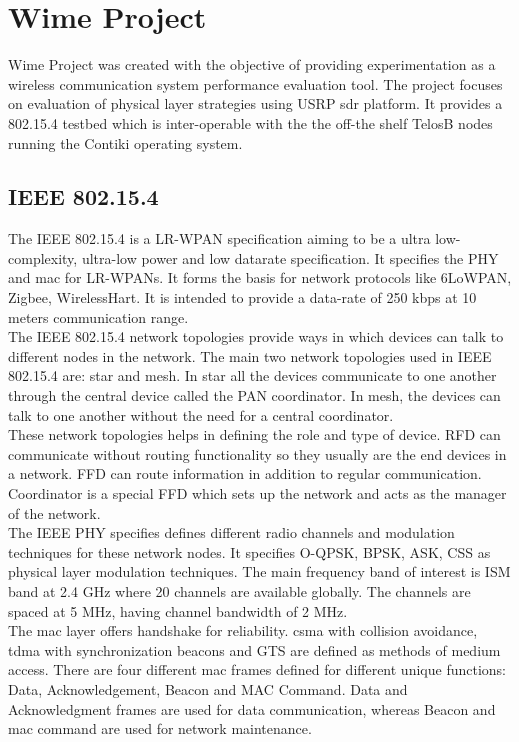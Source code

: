 \section{Wime Project}
Wime Project was created with the objective of providing experimentation as a wireless communication system performance evaluation tool.
The project focuses on evaluation of physical layer strategies using USRP \ac{sdr} platform.
It provides a 802.15.4 testbed which is inter-operable with the the off-the shelf TelosB nodes running the Contiki operating system.

\subsection{IEEE 802.15.4}
The IEEE 802.15.4 is a \ac{LR-WPAN} specification aiming to be a ultra low-complexity, ultra-low power and low datarate specification.
It specifies the \ac{PHY} and \ac{mac} for \ac{LR-WPAN}s.
It forms the basis for network protocols like \ac{6LoWPAN}, Zigbee, WirelessHart.
It is intended to provide a data-rate of 250 kbps at 10 meters communication range.\\

The IEEE 802.15.4 network topologies provide ways in which devices can talk to different nodes in the network.
The main two network topologies used in IEEE 802.15.4 are: star and mesh.
In star all the devices communicate to one another through the central device called the \ac{PAN} coordinator.
In mesh, the devices can talk to one another without the need for a central coordinator.\\

These network topologies helps in defining the role and type of device.
\ac{RFD} can communicate without routing functionality so they usually are the end devices in a network.
\ac{FFD} can route information in addition to regular communication.
Coordinator is a special \ac{FFD} which sets up the network and acts as the manager of the network.\\

The IEEE \ac{PHY} specifies defines different radio channels and modulation techniques for these network nodes.
It specifies \ac{O-QPSK}, \ac{BPSK}, \ac{ASK}, \ac{CSS} as physical layer modulation techniques.
The main frequency band of interest is ISM band at 2.4 GHz where 20  channels are available globally.
The channels are spaced at 5 MHz, having channel bandwidth of 2 MHz.\\

The \ac{mac} layer offers handshake for reliability.
\ac{csma} with collision avoidance, \ac{tdma} with synchronization beacons and \ac{GTS} are defined as methods of medium access.
There are four different \ac{mac} frames defined for different unique functions: Data, Acknowledgement, Beacon and MAC Command.
Data and Acknowledgment frames are used for data communication, whereas Beacon and \ac{mac} command are used for network maintenance.\\

